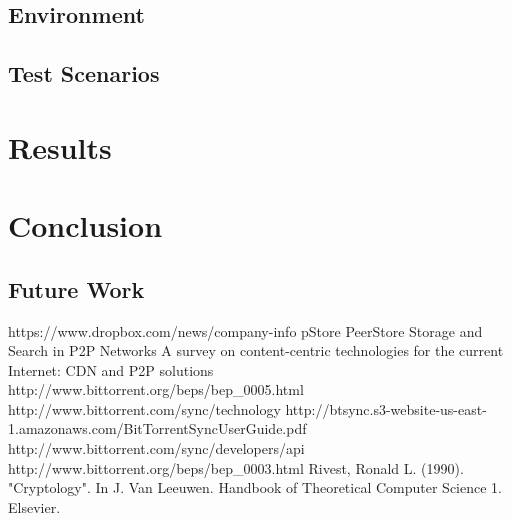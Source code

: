\documentclass[12pt]{report}
\begin{document}
\section{Environment}


\section{Test Scenarios}



\chapter{Results}

\chapter{Conclusion}

\section{Future Work}


\begin{thebibliography}{1}

 https://www.dropbox.com/news/company-info
 pStore
 PeerStore
 Storage and Search in P2P Networks
 A survey on content-centric technologies for the current Internet: CDN and P2P solutions
 http://www.bittorrent.org/beps/bep\_0005.html
 http://www.bittorrent.com/sync/technology
 http://btsync.s3-website-us-east-1.amazonaws.com/BitTorrentSyncUserGuide.pdf
 http://www.bittorrent.com/sync/developers/api
 http://www.bittorrent.org/beps/bep\_0003.html
 Rivest, Ronald L. (1990). "Cryptology". In J. Van Leeuwen. Handbook of Theoretical Computer Science 1. Elsevier.

\end{thebibliography}
\end{document}
